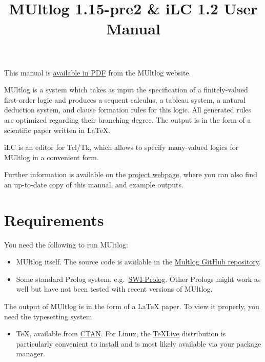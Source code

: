 \documentclass[]{article}
\title{MUltlog 1.15-pre2 \& iLC 1.2 User Manual}
\date{}
\providecommand{\tightlist}{%
  \setlength{\itemsep}{0pt}\setlength{\parskip}{0pt}}
\begin{document}
\maketitle

{
\setcounter{tocdepth}{2}
\tableofcontents
}
This manual is \href{https://logic.at/multlog/multlog.pdf}{available in
PDF} from the MUltlog website.

MUltlog is a system which takes as input the specification of a
finitely-valued first-order logic and produces a sequent calculus, a
tableau system, a natural deduction system, and clause formation rules
for this logic. All generated rules are optimized regarding their
branching degree. The output is in the form of a scientific paper
written in LaTeX.

iLC is an editor for Tcl/Tk, which allows to specify many-valued logics
for MUltlog in a convenient form.

Further information is available on the
\href{http://www.logic.at/multlog/}{project webpage}, where you can also
find an up-to-date copy of this manual, and example outputs.

\hypertarget{requirements}{%
\section{Requirements}\label{requirements}}

You need the following to run MUltlog:

\begin{itemize}
\item
  MUltlog itself. The source code is available in the
  \href{https://github.com/rzach/multlog}{Multlog GitHub repository}.
\item
  Some standard Prolog system,
  e.g.~\href{https://www.swi-prolog.org/}{SWI-Prolog}. Other Prologs
  might work as well but have not been tested with recent versions of
  MUltlog.
\end{itemize}

The output of MUltlog is in the form of a LaTeX paper. To view it
properly, you need the typesetting system

\begin{itemize}
\tightlist
\item
  TeX, available from \href{https://ctan.org/}{CTAN}. For Linux, the
  \href{https://www.tug.org/texlive/}{TeXLive} distribution is
  particularly convenient to install and is most likely available via
  your package manager.
\end{itemize}
\end{document}
